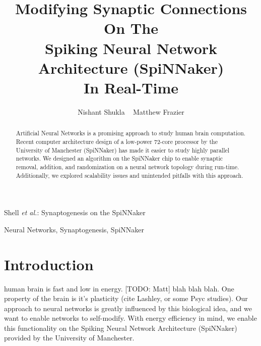 \documentclass[journal]{./sty/IEEEtran}
\begin{document}
%
\title{Modifying Synaptic Connections On The\\Spiking Neural Network Architecture (SpiNNaker)\\In Real-Time
}


\author{Nishant Shukla ~
        Matthew Frazier }

%
{Shell \MakeLowercase{\textit{et al.}}: Synaptogenesis on the SpiNNaker}


\maketitle

\begin{abstract}
Artificial Neural Networks is a promising approach to study human brain computation. Recent computer architecture design of a low-power 72-core processor by the University of Manchester (SpiNNaker) has made it easier to study highly parallel networks. We designed an algorithm on the SpiNNaker chip to enable synaptic removal, addition, and randomization on a neural network topology during run-time. Additionally, we explored scalability issues and unintended pitfalls with this approach.

\end{abstract}

\begin{IEEEkeywords}
Neural Networks, Synaptogenesis, SpiNNaker
\end{IEEEkeywords}


\section{Introduction}
 human brain is fast and low in energy. [TODO: Matt] blah blah blah. One property of the brain is it's plasticity (cite Lashley, or some Psyc studies). Our approach to neural networks is greatly influenced by this biological idea, and we want to enable networks to self-modify. 
With energy efficiency in mind, we enable this functionality on the Spiking Neural Network Architecture (SpiNNaker) provided by the University of Manchester. 
\end{document}
